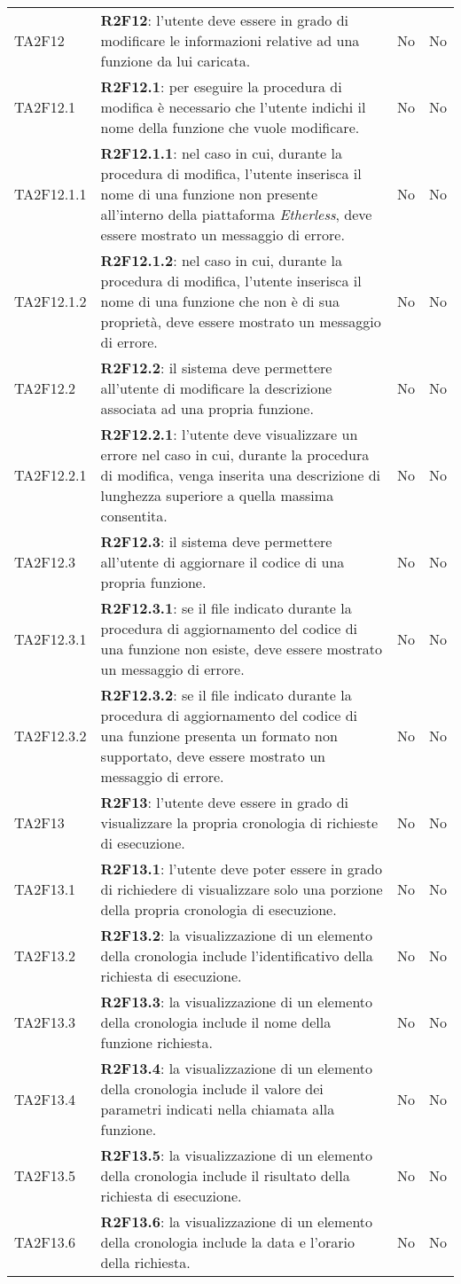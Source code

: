 \begin{longtable}{
		>{\centering}p{} 
		>{}p{}
		>{\centering}p{}
		>{\centering}p{} }
	TA2F12 		& \textbf{R2F12}: l'utente deve essere in grado di modificare le informazioni relative ad una funzione da lui caricata. 																	& No & No \tabularnewline
	TA2F12.1 	& \textbf{R2F12.1}: per eseguire la procedura di modifica è necessario che l'utente indichi il nome della funzione che vuole modificare. 													& No & No \tabularnewline
	TA2F12.1.1 	& \textbf{R2F12.1.1}: nel caso in cui, durante la procedura di modifica, l'utente inserisca il nome di una funzione non presente all'interno della piattaforma \textit{Etherless}, deve essere mostrato un messaggio di errore.	& No & No \tabularnewline
	TA2F12.1.2 	& \textbf{R2F12.1.2}: nel caso in cui, durante la procedura di modifica, l'utente inserisca il nome di una funzione che non è di sua proprietà, deve essere 	mostrato un messaggio di errore. & No & No \tabularnewline
	TA2F12.2 	& \textbf{R2F12.2}: il sistema deve permettere all'utente di modificare la descrizione associata ad una propria funzione. 																	& No & No \tabularnewline
	TA2F12.2.1 	& \textbf{R2F12.2.1}: l'utente deve visualizzare un errore nel caso in cui, durante la procedura di modifica, venga inserita una descrizione di lunghezza superiore a quella massima consentita. 	& No & No \tabularnewline
	TA2F12.3 	& \textbf{R2F12.3}: il sistema deve permettere all'utente di aggiornare il codice di una propria funzione. 																				& No & No \tabularnewline
	TA2F12.3.1 	& \textbf{R2F12.3.1}: se il file indicato durante la procedura di aggiornamento del codice di una funzione non esiste, deve essere mostrato un messaggio di errore.							& No & No \tabularnewline
	TA2F12.3.2 	& \textbf{R2F12.3.2}: se il file indicato durante la procedura di aggiornamento del codice di una funzione presenta un formato non supportato, deve essere mostrato un messaggio di errore.	& No & No \tabularnewline

	TA2F13 		& \textbf{R2F13}: l'utente deve essere in grado di visualizzare la propria cronologia di richieste di esecuzione. 																		& No & No \tabularnewline
	TA2F13.1 	& \textbf{R2F13.1}: l'utente deve poter essere in grado di richiedere di visualizzare solo una porzione della propria cronologia di esecuzione. 											& No & No \tabularnewline
	TA2F13.2 	& \textbf{R2F13.2}: la visualizzazione di un elemento della cronologia include l'identificativo della richiesta di esecuzione. 															& No & No \tabularnewline
	TA2F13.3 	& \textbf{R2F13.3}: la visualizzazione di un elemento della cronologia include il nome della funzione richiesta. 																			& No & No \tabularnewline
	TA2F13.4 	& \textbf{R2F13.4}: la visualizzazione di un elemento della cronologia include il valore dei parametri indicati nella chiamata alla funzione.												& No & No \tabularnewline
	TA2F13.5 	& \textbf{R2F13.5}: la visualizzazione di un elemento della cronologia include il risultato della richiesta di esecuzione.																	& No & No \tabularnewline
	TA2F13.6 	& \textbf{R2F13.6}: la visualizzazione di un elemento della cronologia include la data e l'orario della richiesta. 																		& No & No \tabularnewline


\end{longtable}
